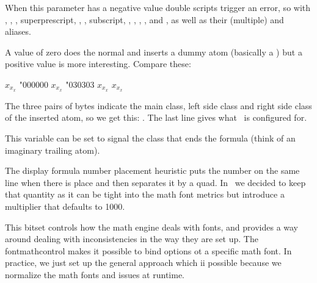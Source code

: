 \startnewprimitive[title={\prm {mathdoublescriptmode}}]

When this parameter has a negative value double scripts trigger an error, so with
, , , \prm
{superprescript}, , , \prm
{subscript}, , , ,
,  and , as well
as their (multiple) \type {_} and \type {^} aliases.

A value of zero does the normal and inserts a dummy atom (basically a \type {{}})
but a positive value is more interesting. Compare these:

\startbuffer
{      $x_x_x$}
{\mathdoublescriptmode"000000 $x_x_x$}
{\mathdoublescriptmode"030303 $x_x_x$}
{$x_x_x$}
\stopbuffer

\typebuffer

The three pairs of bytes indicate the main class, left side class and right side
class of the inserted atom, so we get this: \inlinebuffer. The last line gives
what \CONTEXT\ is configured for.

\stopnewprimitive

\startnewprimitive[title={\prm {mathendclass}}]

This variable can be set to signal the class that ends the formula (think of an
imaginary trailing atom).

\stopnewprimitive

\startnewprimitive[title={\prm {matheqnogapstep}}]

The display formula number placement heuristic puts the number on the same line
when there is place and then separates it by a quad. In \LUATEX\ we decided to
keep that quantity as it can be tight into the math font metrics but introduce
a multiplier  that defaults to 1000.

\stopnewprimitive

\startnewprimitive[title={\prm {mathfontcontrol}}]

This bitset controls how the math engine deals with fonts, and provides a way
around dealing with inconsistencies in the way they are set up. The \prm
{fontmathcontrol} makes it possible to bind options ot a specific math font. In
practice, we just set up the general approach which ii possible because we
normalize the math fonts and  issues at runtime.


